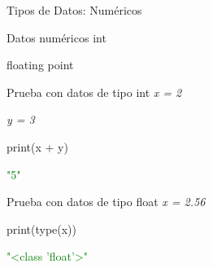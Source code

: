 \documentclass{beamer}
\begin{document}
\begin{frame} {Tipos de Datos: Numéricos}
\label{datos:numericos}
\begin{block}{Datos numéricos}
int

floating point
\end{block}
\begin{Programexample}{Prueba con datos de tipo int}
\centering
\textit{x = 2}

\textit{y = 3}

print(x + y)

\textcolor{green}{"5"}
\end{Programexample}
\begin{Programexample}{Prueba con datos de tipo float}
\centering\textit{x = 2.56}

print(type(x))

\textcolor{green}{"<class 'float'>"}
\end{Programexample}

\end{frame}
\end{document}
